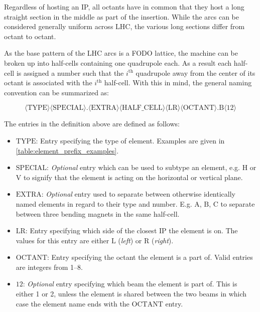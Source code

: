 Regardless of hosting an IP, all octants have in common that they host a long straight section in the middle as part of the insertion.
While the arcs can be considered generally uniform across LHC, the various long sections differ from octant to octant.

As the base pattern of the LHC arcs is a FODO lattice, the machine can be broken up into half-cells containing one quadrupole each.
As a result each half-cell is assigned a number such that the \(i^{\mathrm{th}}\) quadrupole away from the center of its octant is associated with the \(i^{\mathrm{th}}\) half-cell.
With this in mind, the general naming convention can be summarized as:

\begin{equation*}
        \langle \mathrm{TYPE} \rangle \langle \mathrm{SPECIAL} \rangle . \langle \mathrm{EXTRA} \rangle \langle \mathrm{HALF\_CELL} \rangle \langle \mathrm {LR} \rangle \langle \mathrm{OCTANT} \rangle . \mathrm{B} \langle \mathrm{12} \rangle
    \label{equation:lhc_naming_nomenclature}
\end{equation*}

The entries in the definition above are defined as follows:
\begin{itemize}
    \item \(\mathrm{TYPE}\): Entry specifying the type of element. Examples are given in \cref{table:element_prefix_examples}.
    \item \(\mathrm{SPECIAL}\): \textit{Optional} entry which can be used to subtype an element, e.g. \(\mathrm{H}\) or \(\mathrm{V}\) to signify that the element is acting on the horizontal or vertical plane.
    \item \(\mathrm{EXTRA}\): \textit{Optional} entry used to separate between otherwise identically named elements in regard to their type and number. E.g. \(\mathrm{A}\), \(\mathrm{B}\), \(\mathrm{C}\) to separate between three bending magnets in the same half-cell.
    \item \(\mathrm{LR}\): Entry specifying which side of the closest IP the element is on. The values for this entry are either \(\mathrm{L}\) (\textit{left}) or \(\mathrm{R}\) (\textit{right}).
    \item \(\mathrm{OCTANT}\): Entry specifying the octant the element is a part of. Valid entries are integers from \numrange{1}{8}.
    \item \(\mathrm{12}\): \textit{Optional} entry specifying which beam the element is part of. This is either \num{1} or \num{2}, unless the element is shared between the two beams in which case the element name ends with the \(\mathrm{OCTANT}\) entry.
\end{itemize}

